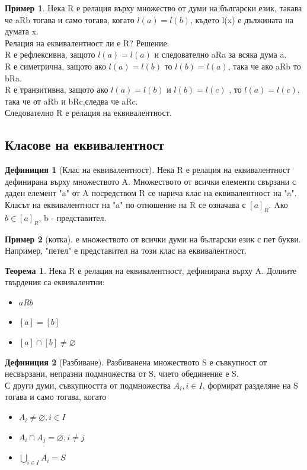 \documentclass[fleqn, 12pt]{article}
\theoremstyle{definition}
\newtheorem{example}{Пример}[subsection]
\newtheorem{definition}{Дефиниция}[subsection]
\newtheorem{theorem}{Теорема}[subsection]
\begin{document}
\begin{example}
Нека R е релация върху множество от думи на български език, такава че aRb тогава и само тогава, когато $l(a) = l(b)$, където l(x) е дължината на думата x.\\
Релация на еквивалентност ли е R?
Решение: \\
R е рефлексивна, защото $l(a) = l(a)$ и следователно aRa за всяка дума a.\\
R е симетрична, защото ако $l(a) = l(b)$ то $l(b) = l(a)$, така че ако aRb то bRa.\\
R е транзитивна, защото ако $l(a) = l(b)$ и $l(b) = l(c)$ , то $l(a) = l(c)$, така че от aRb и bRc,следва че aRc.\\
Следователно R е релация на еквивалентност.
\end{example}

\subsection{Класове на еквивалентност}

\begin{definition}[Клас на еквивалентност]
Нека R е релация на еквивалентност дефинирана върху множеството A. Множеството от всички елементи свързани с даден елемент "a"\! от A посредством R се нарича клас на еквивалентност на "a". \\
Класът на еквивалентност на "a" \! по отношение на R се означава с $[a]_R$.
Aко $b \in [a]_R$, b - представител.
\end{definition}

\begin{example}
[котка] е множеството от всички думи на български език с пет букви. Например, "петел" е представител на този клас на еквивалентност.
\end{example}

\begin{theorem}
Нека R е релация на еквивалентност, дефинирана върху A. Долните твърдения са еквивалентни:
\begin{itemize}
\item $aRb$
\item $[a] = [b]$
\item $[a] \cap [b] \neq \varnothing$
\end{itemize}
\end{theorem}

\begin{definition}[Разбиване]
Разбиванена множеството S е съвкупност от несвързани, непразни подмножества от S, чието обединение е S. \\
С други думи, съвкупността от подмножества $A_i, i\in I$, формират разделяне на S тогава и само тогава, когато

\begin{itemize}
\item $A_i \neq \varnothing, i \in I$
\item $A_i \cap A_j = \varnothing, i \neq j$
\item $\bigcup_{i \in I} A_i = S$
\end{itemize}

\end{definition}
\end{document}
